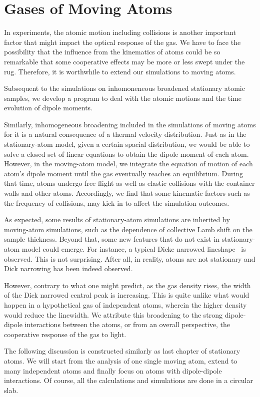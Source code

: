 \chapter{Gases of Moving Atoms}
In experiments, the atomic motion including collisions is another important factor that might impact the optical response of the gas. We have to face the possibility that the influence from the kinematics of atoms could be so remarkable that some cooperative effects may be more or less swept under the rug. Therefore, it is worthwhile to extend our simulations to moving atoms. 

Subsequent to the simulations on inhomoneneous broadened stationary atomic samples, we develop a program to deal with the atomic motions and the time evolution of dipole moments. 

Similarly, inhomogeneous broadening included in the simulations of moving atoms for it is a natural consequence of a thermal velocity distribution. Just as in the stationary-atom model, given a certain spacial distribution, we would be able to solve a closed set of linear equations to obtain the dipole moment of each atom.  However, in the moving-atom model, we integrate the equation of motion of each atom's dipole moment until the gas eventually reaches an equilibrium. During that time, atoms undergo free flight as well as elastic collisions with the container walls and other atoms. Accordingly, we find that some kinematic factors such as the frequency of collisions, may kick in to affect the simulation outcomes.

As expected, some results of stationary-atom simulations are inherited by moving-atom simulations, such as the dependence of collective Lamb shift on the sample thickness. Beyond that, some new features that do not exist in stationary-atom model could emerge. For instance, a typical Dicke narrowed lineshape~\cite{PhysRev.89.472} is observed. This is not surprising. After all, in reality, atoms are not stationary and Dick narrowing has been indeed observed.

However, contrary to what one might predict, as the gas density rises, the width of the Dick narrowed central peak is increasing. This is quite unlike what would happen in a hypothetical gas of independent atoms, wherein the higher density would reduce the linewidth. We attribute this broadening to the strong dipole-dipole interactions between the atoms, or from an overall perspective, the cooperative response of the gas to light. 

The following discussion is constructed similarly as last chapter of stationary atoms. We will start from the analysis of one single moving atom, extend to many independent atoms and finally focus on atoms with dipole-dipole interactions. Of course, all the calculations and simulations are done in a circular slab.

